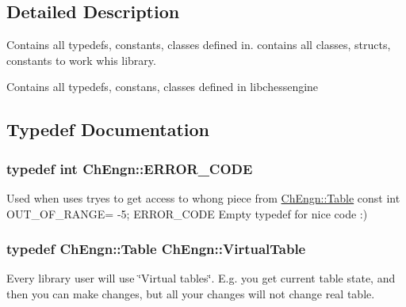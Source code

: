 \subsection{Detailed Description}
Contains all typedefs, constants, classes defined in. contains all classes, structs, constants to work whis library.

Contains all typedefs, constans, classes defined in libchessengine 

\subsection{Typedef Documentation}
\hypertarget{namespaceChEngn_a347ab4e4a29f725ed0253d8311c82233}{
\subsubsection[{ERROR\_\-CODE}]{\setlength{\rightskip}{0pt plus 5cm}typedef int {\bf ChEngn::ERROR\_\-CODE}}}
\label{namespaceChEngn_a347ab4e4a29f725ed0253d8311c82233}
Used when uses tryes to get access to whong piece from \hyperlink{classChEngn_1_1Table}{ChEngn::Table} const int OUT\_\-OF\_\-RANGE= -\/5; ERROR\_\-CODE Empty typedef for nice code :) \hypertarget{namespaceChEngn_a5ba229504d25ed1b2086f1df62f6db41}{
\subsubsection[{VirtualTable}]{\setlength{\rightskip}{0pt plus 5cm}typedef {\bf ChEngn::Table} {\bf ChEngn::VirtualTable}}}
\label{namespaceChEngn_a5ba229504d25ed1b2086f1df62f6db41}
Every library user will use \char`\"{}Virtual tables\char`\"{}. E.g. you get current table state, and then you can make changes, but all your changes will not change real table. 

